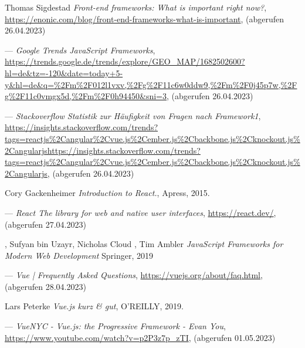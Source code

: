 %

\begin{thebibliography}{99}

    Thomas Sigdestad
	\emph{Front-end frameworks: What is important right now?},
	\url{https://enonic.com/blog/front-end-frameworks-what-is-important},
    (abgerufen 26.04.2023)

	---
	\emph{Google Trends JavaScript Frameworks},
	\url{https://trends.google.de/trends/explore/GEO_MAP/1682502600?hl=de&tz=-120&date=today+5-y&hl=de&q=%2Fm%2F012l1vxv,%2Fg%2F11c6w0ddw9,%2Fm%2F0j45p7w,%2Fg%2F11c0vmgx5d,%2Fm%2F0h94450&sni=3},
	(abgerufen 26.04.2023)

	---
	\emph{Stackoverflow Statistik zur Häufigkeit von Fragen nach Framework1},
	\url{https://insights.stackoverflow.com/trends?tags=reactjs%2Cangular%2Cvue.js%2Cember.js%2Cbackbone.js%2Cknockout.js%2Cangularjshttps://insights.stackoverflow.com/trends?tags=reactjs%2Cangular%2Cvue.js%2Cember.js%2Cbackbone.js%2Cknockout.js%2Cangularjs},
	(abgerufen 26.04.2023)

	Cory Gackenheimer
	\emph{Introduction to React.},
	Apress,
	2015.

	---
	\emph{React
	The library for web and native user interfaces},
	\url{https://react.dev/},
	(abgerufen 27.04.2023)

,
	Sufyan bin Uzayr, Nicholas Cloud , Tim Ambler
	\emph{JavaScript Frameworks for Modern Web Development}
	Springer,
	2019

	---
	\emph{Vue | Frequently Asked Questions},
	\url{https://vuejs.org/about/faq.html},
	(abgerufen 28.04.2023)

	Lars Peterke
	\emph{Vue.js kurz \& gut},
	O’REILLY,
	2019.

	---
	\emph{VueNYC - Vue.js: the Progressive Framework - Evan You},
	\url{https://www.youtube.com/watch?v=p2P3z7p_zTI},
	(abgerufen 01.05.2023)


\end{thebibliography}
